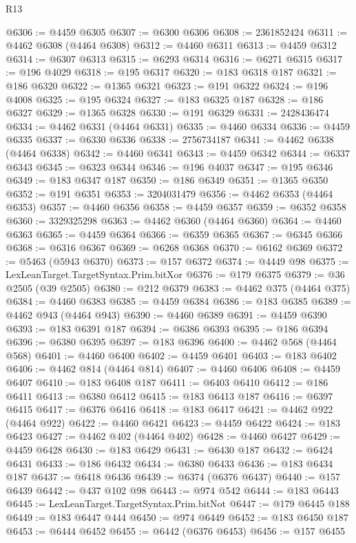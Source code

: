 \begin{lexlean}{R13}
\begin{coremodule}
@6306 := @4459 @6305
@6307 := @6300 @6306
@6308 := 2361852424
@6311 := @4462 @6308 (@4464 @6308)
@6312 := @4460 @6311
@6313 := @4459 @6312
@6314 := @6307 @6313
@6315 := @6293 @6314
@6316 := @6271 @6315
@6317 := @196 @4029
@6318 := @195 @6317
@6320 := @183 @6318 @187
@6321 := @186 @6320
@6322 := @1365 @6321
@6323 := @191 @6322
@6324 := @196 @4008
@6325 := @195 @6324
@6327 := @183 @6325 @187
@6328 := @186 @6327
@6329 := @1365 @6328
@6330 := @191 @6329
@6331 := 2428436474
@6334 := @4462 @6331 (@4464 @6331)
@6335 := @4460 @6334
@6336 := @4459 @6335
@6337 := @6330 @6336
@6338 := 2756734187
@6341 := @4462 @6338 (@4464 @6338)
@6342 := @4460 @6341
@6343 := @4459 @6342
@6344 := @6337 @6343
@6345 := @6323 @6344
@6346 := @196 @4037
@6347 := @195 @6346
@6349 := @183 @6347 @187
@6350 := @186 @6349
@6351 := @1365 @6350
@6352 := @191 @6351
@6353 := 3204031479
@6356 := @4462 @6353 (@4464 @6353)
@6357 := @4460 @6356
@6358 := @4459 @6357
@6359 := @6352 @6358
@6360 := 3329325298
@6363 := @4462 @6360 (@4464 @6360)
@6364 := @4460 @6363
@6365 := @4459 @6364
@6366 := @6359 @6365
@6367 := @6345 @6366
@6368 := @6316 @6367
@6369 := @6268 @6368
@6370 := @6162 @6369
@6372 := @5463 (@5943 @6370)
@6373 := @157 @6372
@6374 := @4449 @98
@6375 := LexLeanTarget.TargetSyntax.Prim.bitXor
@6376 := @179 @6375
@6379 := @36 @2505 (@39 @2505)
@6380 := @212 @6379
@6383 := @4462 @375 (@4464 @375)
@6384 := @4460 @6383
@6385 := @4459 @6384
@6386 := @183 @6385
@6389 := @4462 @943 (@4464 @943)
@6390 := @4460 @6389
@6391 := @4459 @6390
@6393 := @183 @6391 @187
@6394 := @6386 @6393
@6395 := @186 @6394
@6396 := @6380 @6395
@6397 := @183 @6396
@6400 := @4462 @568 (@4464 @568)
@6401 := @4460 @6400
@6402 := @4459 @6401
@6403 := @183 @6402
@6406 := @4462 @814 (@4464 @814)
@6407 := @4460 @6406
@6408 := @4459 @6407
@6410 := @183 @6408 @187
@6411 := @6403 @6410
@6412 := @186 @6411
@6413 := @6380 @6412
@6415 := @183 @6413 @187
@6416 := @6397 @6415
@6417 := @6376 @6416
@6418 := @183 @6417
@6421 := @4462 @922 (@4464 @922)
@6422 := @4460 @6421
@6423 := @4459 @6422
@6424 := @183 @6423
@6427 := @4462 @402 (@4464 @402)
@6428 := @4460 @6427
@6429 := @4459 @6428
@6430 := @183 @6429
@6431 := @6430 @187
@6432 := @6424 @6431
@6433 := @186 @6432
@6434 := @6380 @6433
@6436 := @183 @6434 @187
@6437 := @6418 @6436
@6439 := @6374 (@6376 @6437)
@6440 := @157 @6439
@6442 := @437 @102 @98
@6443 := @974 @542
@6444 := @183 @6443
@6445 := LexLeanTarget.TargetSyntax.Prim.bitNot
@6447 := @179 @6445 @188
@6449 := @183 @6447 @444
@6450 := @974 @6449
@6452 := @183 @6450 @187
@6453 := @6444 @6452
@6455 := @6442 (@6376 @6453)
@6456 := @157 @6455

\end{coremodule}
\end{lexlean}
